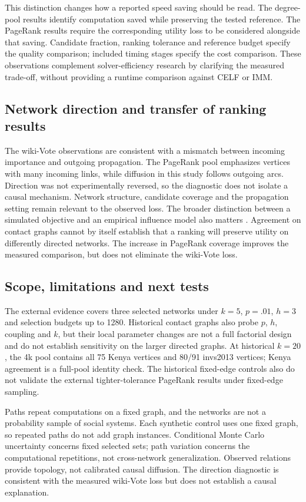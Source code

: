 \documentclass[smallextended]{svjour3}
\begin{document}
This distinction changes how a reported speed saving should be read. The degree-pool results identify computation saved while preserving the tested reference. The PageRank results require the corresponding utility loss to be considered alongside that saving. Candidate fraction, ranking tolerance and reference budget specify the quality comparison; included timing stages specify the cost comparison. These observations complement solver-efficiency research by clarifying the measured trade-off, without providing a runtime comparison against CELF or IMM.

\subsection{Network direction and transfer of ranking results}
The wiki-Vote observations are consistent with a mismatch between incoming importance and outgoing propagation. The PageRank pool emphasizes vertices with many incoming links, while diffusion in this study follows outgoing arcs. Direction was not experimentally reversed, so the diagnostic does not isolate a causal mechanism. Network structure, candidate coverage and the propagation setting remain relevant to the observed loss. The broader distinction between a simulated objective and an empirical influence model also matters \cite{ref15}. Agreement on contact graphs cannot by itself establish that a ranking will preserve utility on differently directed networks. The increase in PageRank coverage improves the measured comparison, but does not eliminate the wiki-Vote loss.

\subsection{Scope, limitations and next tests}
The external evidence covers three selected networks under $k=5$, $p=.01$, $h=3$ and selection budgets up to 1280. Historical contact graphs also probe $p$, $h$, coupling and $k$, but their local parameter changes are not a full factorial design and do not establish sensitivity on the larger directed graphs. At historical $k=20$, the 4k pool contains all 75 Kenya vertices and 80/91 invs2013 vertices; Kenya agreement is a full-pool identity check. The historical fixed-edge controls also do not validate the external tighter-tolerance PageRank results under fixed-edge sampling.

Paths repeat computations on a fixed graph, and the networks are not a probability sample of social systems. Each synthetic control uses one fixed graph, so repeated paths do not add graph instances. Conditional Monte Carlo uncertainty concerns fixed selected sets; path variation concerns the computational repetitions, not cross-network generalization. Observed relations provide topology, not calibrated causal diffusion. The direction diagnostic is consistent with the measured wiki-Vote loss but does not establish a causal explanation.
\end{document}
